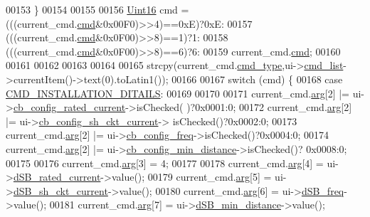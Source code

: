 \begin{DoxyCode}
00153    \}
00154 
00155 
00156     \hyperlink{a00001_aae7407b021d43f7193a81a58cfb3e297}{Uint16} cmd = (((current\_cmd.\hyperlink{a00001_af20664dc9ca2b752c73d524edee0e07a}{cmd}&0x00F0)>>4)==0xE)?0xE:
00157                  (((current\_cmd.\hyperlink{a00001_af20664dc9ca2b752c73d524edee0e07a}{cmd}&0x0F00)>>8)==1)?1:
00158                  (((current\_cmd.\hyperlink{a00001_af20664dc9ca2b752c73d524edee0e07a}{cmd}&0x0F00)>>8)==6)?6:                
00159                  current\_cmd.\hyperlink{a00001_af20664dc9ca2b752c73d524edee0e07a}{cmd};
00160 
00161 
00162 
00163 
00164 
00165     strcpy(current\_cmd.\hyperlink{a00001_a217dc0db956d3bb46d8573960cb7359a}{cmd\_type},ui->\hyperlink{a00027_aa66ece71395b435e915d384fb63bac1d}{cmd\_list}->currentItem()->text(0).toLatin1());
00166 
00167     \textcolor{keywordflow}{switch} (cmd) \{
00168     \textcolor{keywordflow}{case} \hyperlink{a00031_af91ff280feea1f52e3bdd7f0f556d153}{CMD\_INSTALLATION\_DITAILS}:
00169 
00170 
00171             current\_cmd.\hyperlink{a00001_a56e6c2d7315d0ae60a51e8b140c9cfe4}{arg}[2]         |= ui->\hyperlink{a00027_af4863849ff58931ae3a38aa5b40b8158}{cb\_config\_rated\_current}->isChecked(
      )?0x0001:0;
00172             current\_cmd.\hyperlink{a00001_a56e6c2d7315d0ae60a51e8b140c9cfe4}{arg}[2]         |= ui->\hyperlink{a00027_a541de6e510677e572ab233f7ecc25e2c}{cb\_config\_sh\_ckt\_current}->
      isChecked()?0x0002:0;
00173             current\_cmd.\hyperlink{a00001_a56e6c2d7315d0ae60a51e8b140c9cfe4}{arg}[2]         |= ui->\hyperlink{a00027_a8f501acefacd6343a4ec99a67172f256}{cb\_config\_freq}->isChecked()?0x0004:0;
00174             current\_cmd.\hyperlink{a00001_a56e6c2d7315d0ae60a51e8b140c9cfe4}{arg}[2]         |= ui->\hyperlink{a00027_a6b0d09f3b380fdb810d3da3f5208ccf5}{cb\_config\_min\_distance}->isChecked()?
      0x0008:0;
00175 
00176             current\_cmd.\hyperlink{a00001_a56e6c2d7315d0ae60a51e8b140c9cfe4}{arg}[3]          = 4;
00177 
00178             current\_cmd.\hyperlink{a00001_a56e6c2d7315d0ae60a51e8b140c9cfe4}{arg}[4]          = ui->\hyperlink{a00027_ab6d7c3a292c79cd73aff8735df48d30e}{dSB\_rated\_current}->value();
00179             current\_cmd.\hyperlink{a00001_a56e6c2d7315d0ae60a51e8b140c9cfe4}{arg}[5]          = ui->\hyperlink{a00027_aab5fcfd5ceedb9c4e853139113f5c753}{dSB\_sh\_ckt\_current}->value();
00180             current\_cmd.\hyperlink{a00001_a56e6c2d7315d0ae60a51e8b140c9cfe4}{arg}[6]          = ui->\hyperlink{a00027_abd528de839feccc001dc62b3aecddc9f}{dSB\_freq}->value();
00181             current\_cmd.\hyperlink{a00001_a56e6c2d7315d0ae60a51e8b140c9cfe4}{arg}[7]          = ui->\hyperlink{a00027_a01c23085590f4947828948bbd9f50cc7}{dSB\_min\_distance}->value();

\end{DoxyCode}
